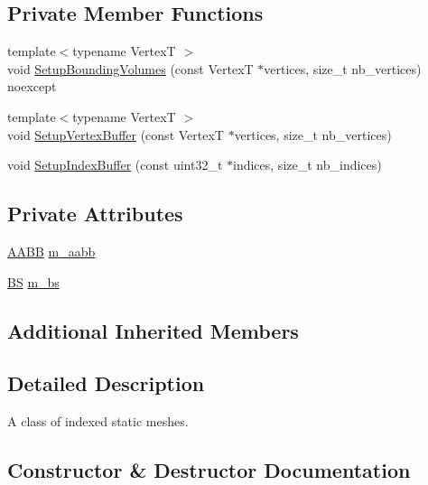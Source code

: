 \subsection*{Private Member Functions}
\begin{DoxyCompactItemize}
\item 
{\footnotesize template$<$typename VertexT $>$ }\\void \hyperlink{classmage_1_1_static_mesh_a532dcf96ac9b1bf7988a0726d1eb2fe5}{Setup\+Bounding\+Volumes} (const VertexT $\ast$vertices, size\+\_\+t nb\+\_\+vertices) noexcept
\item 
{\footnotesize template$<$typename VertexT $>$ }\\void \hyperlink{classmage_1_1_static_mesh_a66d1b876d80987abec5f1e4db3edc9a2}{Setup\+Vertex\+Buffer} (const VertexT $\ast$vertices, size\+\_\+t nb\+\_\+vertices)
\item 
void \hyperlink{classmage_1_1_static_mesh_acebe0c6014932681b63109bc75754f87}{Setup\+Index\+Buffer} (const uint32\+\_\+t $\ast$indices, size\+\_\+t nb\+\_\+indices)
\end{DoxyCompactItemize}
\subsection*{Private Attributes}
\begin{DoxyCompactItemize}
\item 
\hyperlink{structmage_1_1_a_a_b_b}{A\+A\+BB} \hyperlink{classmage_1_1_static_mesh_ae295e5ab8242dd6464c71eda10ca2f85}{m\+\_\+aabb}
\item 
\hyperlink{structmage_1_1_b_s}{BS} \hyperlink{classmage_1_1_static_mesh_ae5a9d7c89d7253130329d7b482045c8f}{m\+\_\+bs}
\end{DoxyCompactItemize}
\subsection*{Additional Inherited Members}


\subsection{Detailed Description}
A class of indexed static meshes. 

\subsection{Constructor \& Destructor Documentation}
\hypertarget{classmage_1_1_static_mesh_ab66b5c11fee10d2e7cbe8bdd4b45d6fe}{}\label{classmage_1_1_static_mesh_ab66b5c11fee10d2e7cbe8bdd4b45d6fe} 
